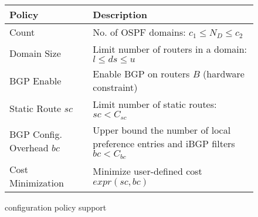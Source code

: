 \begin{wrapfigure}{r}{0.57\textwidth}
\vspace{-2mm}
\small
\begin{minipage}{\linewidth}
	\begin{tabular}{m{7.4em}  m{15.6em} } 
			{\bf Policy} & {\bf Description} \\ 
			\hline
			Count  & No. of OSPF domains: $c_1\leq N_D\leq c_2$  \\ \hline
			Domain Size  & Limit number of routers in a domain: $l\leq ds\leq u$ \\ \hline
			BGP Enable & Enable BGP on routers $B$ (hardware constraint) \\ \hline
			Static Route ${sc}$ & Limit number of static routes: $sc < C_{sc}$ \\ \hline
			BGP Config. Overhead $bc$ & Upper bound the number of local preference entries and iBGP filters $bc < C_{bc}$ \\ \hline
			Cost Minimization & Minimize user-defined cost $expr(sc, bc)$
		\end{tabular}
				
	\end{minipage}
\caption{\name configuration policy support} 
\label{tab:configpolicysupport}
\end{wrapfigure}